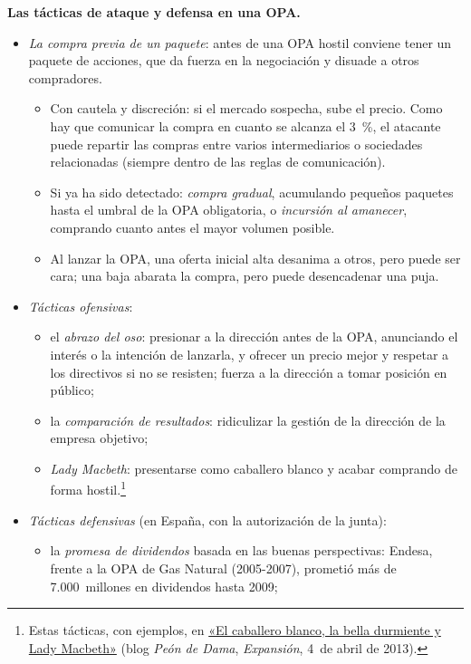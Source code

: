 \documentclass[11pt]{article}
\begin{document}
\begin{anotaciones}
\textbf{Las tácticas de ataque y defensa en una OPA.}
\begin{itemize}
\item \emph{La compra previa de un paquete}: antes de una OPA hostil conviene tener un paquete de acciones, que da fuerza en la negociación y disuade a otros compradores.
  \begin{itemize}
  \item Con cautela y discreción: si el mercado sospecha, sube el precio. Como hay que comunicar la compra en cuanto se alcanza el 3~\%, el atacante puede repartir las compras entre varios intermediarios o sociedades relacionadas (siempre dentro de las reglas de comunicación).
  \item Si ya ha sido detectado: \emph{compra gradual}, acumulando pequeños paquetes hasta el umbral de la OPA obligatoria, o \emph{incursión al amanecer}, comprando cuanto antes el mayor volumen posible.
  \item Al lanzar la OPA, una oferta inicial alta desanima a otros, pero puede ser cara; una baja abarata la compra, pero puede desencadenar una puja.
  \end{itemize}
\item \emph{Tácticas ofensivas}:
  \begin{itemize}
  \item el \emph{abrazo del oso}: presionar a la dirección antes de la OPA, anunciando el interés o la intención de lanzarla, y ofrecer un precio mejor y respetar a los directivos si no se resisten; fuerza a la dirección a tomar posición en público;
  \item la \emph{comparación de resultados}: ridiculizar la gestión de la dirección de la empresa objetivo;
  \item \emph{Lady Macbeth}: presentarse como caballero blanco y acabar comprando de forma hostil.\footnote{Estas tácticas, con ejemplos, en \href{https://www.expansion.com/blogs/peon-de-dama/2013/04/04/el-caballero-blanco-la-bella-durmiente-y.html}{«El caballero blanco, la bella durmiente y Lady Macbeth»} (blog \emph{Peón de Dama}, \emph{Expansión}, 4~de abril de 2013).}
  \end{itemize}
\item \emph{Tácticas defensivas} (en España, con la autorización de la junta):
  \begin{itemize}
  \item la \emph{promesa de dividendos} basada en las buenas perspectivas: Endesa, frente a la OPA de Gas Natural (2005-2007), prometió más de 7.000~millones en dividendos hasta 2009\nocite{CNMV2005OPAGasNatural};

\end{itemize}
\end{itemize}
\end{anotaciones}
\end{document}
